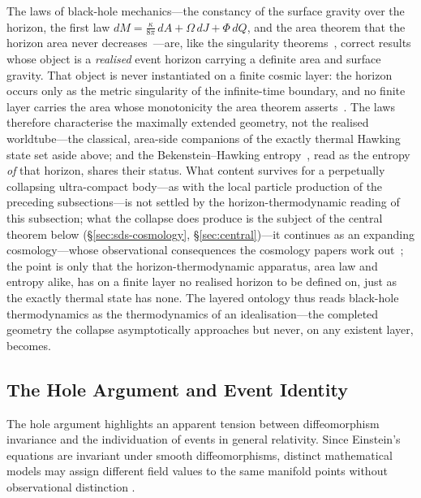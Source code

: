 \documentclass[11pt,a4paper]{article}
\theoremstyle{plain}
\theoremstyle{definition}
\theoremstyle{remark}
\begin{document}
The laws of black-hole mechanics---the constancy of the surface gravity over the horizon, the first law $dM=\tfrac{\kappa}{8\pi}\,dA+\Omega\,dJ+\Phi\,dQ$, and the area theorem that the horizon area never decreases~\cite{Bardeen1973,Hawking1971}---are, like the singularity theorems~\cite{Penrose1965}, correct results whose object is a \emph{realised} event horizon carrying a definite area and surface gravity. That object is never instantiated on a finite cosmic layer: the horizon occurs only as the metric singularity of the infinite-time boundary, and no finite layer carries the area whose monotonicity the area theorem asserts~\cite{JanzenBHcausality}. The laws therefore characterise the maximally extended geometry, not the realised worldtube---the classical, area-side companions of the exactly thermal Hawking state set aside above; and the Bekenstein--Hawking entropy~\cite{Bekenstein1973}, read as the entropy \emph{of} that horizon, shares their status. What content survives for a perpetually collapsing ultra-compact body---as with the local particle production of the preceding subsections---is not settled by the horizon-thermodynamic reading of this subsection; what the collapse does produce is the subject of the central theorem below (\S\ref{sec:sds-cosmology}, \S\ref{sec:central})---it continues as an expanding cosmology---whose observational consequences the cosmology papers work out~\cite{JanzenCRcosmology}; the point is only that the horizon-thermodynamic apparatus, area law and entropy alike, has on a finite layer no realised horizon to be defined on, just as the exactly thermal state has none. The layered ontology thus reads black-hole thermodynamics as the thermodynamics of an idealisation---the completed geometry the collapse asymptotically approaches but never, on any existent layer, becomes.

\subsection{The Hole Argument and Event Identity}\label{sec:CR-hole}

The hole argument highlights an apparent tension between diffeomorphism invariance and the individuation of events in general relativity. Since Einstein's equations are invariant under smooth diffeomorphisms, distinct mathematical models may assign different field values to the same manifold points without observational distinction \cite{EarmanNorton1987}.
\end{document}
